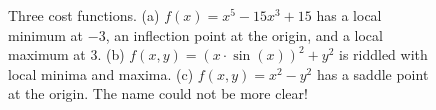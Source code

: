 \begin{figure}[htb]%
\centering
{}%
\newline
{}%
\hspace{20pt}
\hfill%
%
\hfill
    \caption[]{Three cost functions. (a) $f(x) = x^5 - 15x^3 + 15$ has a local minimum at $-3$, an inflection point at the origin, and a local maximum at $3$. (b) $f(x, y) = (x\cdot \sin(x))^2 + y^2$ is riddled with local minima and maxima. (c) $f(x, y) = x^2 - y^2$ has a saddle point at the origin. The name could not be more clear!}
    \label{fig:OptimizationVocabularyVisualized}
\end{figure}

\FloatBarrier


